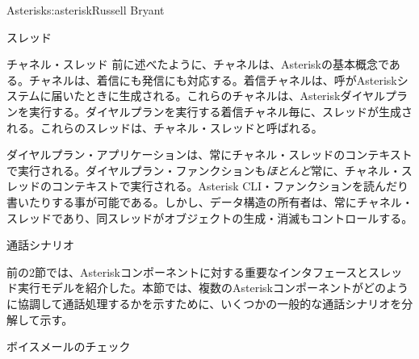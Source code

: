 \begin{aosachapter}{Asterisk}{s:asterisk}{Russell Bryant}
\begin{aosasect1}{スレッド}
\begin{aosasect2}{チャネル・スレッド}
前に述べたように、チャネルは、Asteriskの基本概念である。チャネルは、着信にも発信にも対応する。着信チャネルは、呼がAsteriskシステムに届いたときに生成される。これらのチャネルは、Asteriskダイヤルプランを実行する。ダイヤルプランを実行する着信チャネル毎に、スレッドが生成される。これらのスレッドは、チャネル・スレッドと呼ばれる。

ダイヤルプラン・アプリケーションは、常にチャネル・スレッドのコンテキストで実行される。ダイヤルプラン・ファンクションも\emph{ほとんど}常に、チャネル・スレッドのコンテキストで実行される。Asterisk CLI・ファンクションを読んだり書いたりする事が可能である。しかし、データ構造の所有者は、常にチャネル・スレッドであり、同スレッドがオブジェクトの生成・消滅もコントロールする。

\end{aosasect2}

\end{aosasect1}

\begin{aosasect1}{通話シナリオ}

前の2節では、Asteriskコンポーネントに対する重要なインタフェースとスレッド実行モデルを紹介した。本節では、複数のAsteriskコンポーネントがどのように協調して通話処理するかを示すために、いくつかの一般的な通話シナリオを分解して示す。

\begin{aosasect2}{ボイスメールのチェック}


\end{aosasect2}
\end{aosasect1}
\end{aosachapter}
